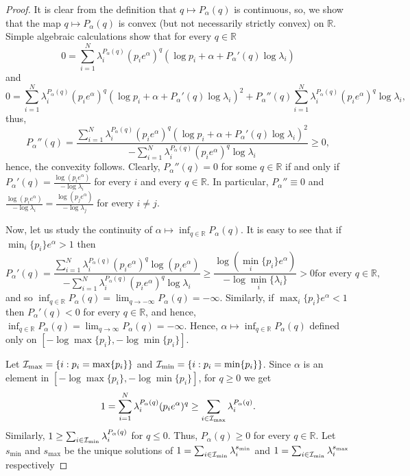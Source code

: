 \documentclass[12pt,]{article}
\theoremstyle{definition}
\theoremstyle{remark}
\renewcommand{\Bbb}[1]{\mathbb{#1}}
\newcommand{\bbR}{{\Bbb R}}        %
\newcommand{\cI}{{\cal I}}
\newcommand{\0}{\mathbf{0}}
\begin{document}
\begin{proof}
  It is clear from the definition that $q\mapsto P_\alpha(q)$ is continuous, so, we show that the
  map $q\mapsto P_{\alpha}(q)$ is convex (but not necessarily strictly convex) on $\bbR$. Simple
  algebraic calculations show that for every $q\in\bbR$
  \begin{equation}\label{eq:Pder}
    0=\sum_{i=1}^N\lambda_i^{P_\alpha(q)}(p_ie^\alpha)^q\left(\log p_i+\alpha+P_\alpha'(q)\log\lambda_i\right)
  \end{equation}
  and
  $$
  0=\sum_{i=1}^N\lambda_i^{P_\alpha(q)}(p_ie^\alpha)^q\left(\log
  p_i+\alpha+P_\alpha'(q)\log\lambda_i\right)^2+P_\alpha''(q)\sum_{i=1}^N\lambda_i^{P_\alpha(q)}(p_ie^\alpha)^q
  \log\lambda_i,
  $$
  thus,
  $$
  P_\alpha''(q)=\frac{\sum_{i=1}^N\lambda_i^{P_\alpha(q)}(p_ie^\alpha)^q\left(\log
  p_i+\alpha+P_\alpha'(q)\log\lambda_i\right)^2}{-\sum_{i=1}^N\lambda_i^{P_\alpha(q)}(p_ie^\alpha)^q
  \log\lambda_i}\geq0,
  $$
  hence, the convexity follows. Clearly, $P_\alpha''(q)=0$ for some $q\in\bbR$ if and only if
  $P_\alpha'(q)=\frac{\log(p_ie^\alpha)}{-\log\lambda_i}$ for every $i$ and every $q\in\bbR$. In
  particular, $P_\alpha''\equiv0$ and
  $\frac{\log(p_ie^\alpha)}{-\log\lambda_i}=\frac{\log(p_je^\alpha)}{-\log\lambda_j}$ for every
  $i\neq j$.

  Now, let us study the continuity of $\alpha\mapsto\inf_{q\in\bbR}P_\alpha(q)$. It is easy to see
  that if $\min_i\{p_i\}e^\alpha>1$ then
  \[
    P_\alpha'(q)=\frac{\sum_{i=1}^N\lambda_i^{P_\alpha(q)}(p_ie^\alpha)^q\log(p_ie^\alpha)}{-\sum_{i=1}^N\lambda_i^{P_\alpha(q)}(p_ie^\alpha)^q\log\lambda_i}\geq\frac{\log(\min_i\{p_i\}e^\alpha)}{-\log\min_i\{\lambda_i\}}>0\text{
    for every }q\in\bbR,
  \]
  and so $\inf_{q\in\bbR}P_\alpha(q)=\lim_{q\to-\infty}P_\alpha(q)=-\infty$. Similarly, if  $\max_i\{p_i\}e^\alpha<1$ then $P_\alpha'(q)<0$ for every $q\in\bbR$, and hence, $\inf_{q\in\bbR}P_\alpha(q)=\lim_{q\to\infty}P_\alpha(q)=-\infty$. Hence, $\alpha\mapsto\inf_{q\in\bbR}P_\alpha(q)$ defined only on $[-\log\max\{p_i\},-\log\min\{p_i\}]$.

  Let $\cI_{\max}=\{i:p_i=\max\{p_i\}\}$ and $\cI_{\min}=\{i:p_i=\min\{p_i\}\}$. Since
  $\alpha$ is an element in $[-\log\max\{p_i\},-\log\min\{p_i\}]$, for $q\geq0$ we get
  $$
  1=\sum_{i=1}^N\lambda_i^{P_\alpha(q)}(p_ie^\alpha)^q\geq\sum_{i\in \cI_{\max}}\lambda_i^{P_\alpha(q)}.
  $$
  Similarly, $1\geq\sum_{i\in \cI_{\min}}\lambda_i^{P_\alpha(q)}$ for $q\leq 0$. Thus,
  $P_\alpha(q)\geq0$ for every $q\in\bbR$. Let $s_{\min}$ and $s_{\max}$ be the unique solutions of
  $1=\sum_{i\in \cI_{\min}}\lambda_i^{s_{\min}}$ and $1=\sum_{i\in \cI_{\min}}\lambda_i^{s_{\max}}$
  respectively


\end{proof}
\end{document}
